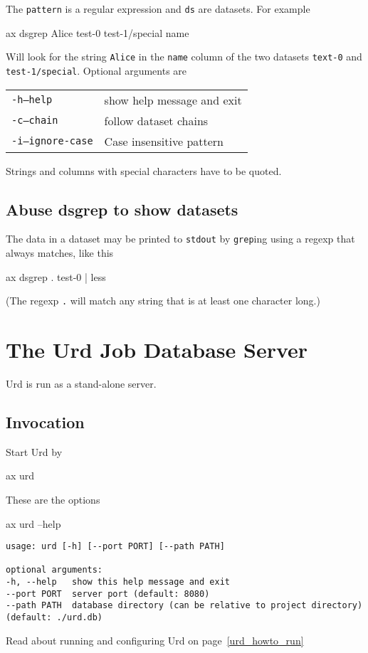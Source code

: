 The \texttt{pattern} is a regular expression and \texttt{ds} are
datasets.  For example
\begin{shell}
ax dsgrep Alice test-0 test-1/special name
\end{shell}
Will look for the string \texttt{Alice} in the \texttt{name} column of
the two datasets \texttt{text-0} and \texttt{test-1/special}.
Optional arguments are
\begin{snugshade}
  \begin{tabular}{p{4cm}p{9cm}}
      \texttt{-h}\hspace{3cm}\texttt{--help} & show help message and exit\\[4ex]
      \texttt{-c}\hspace{3cm}\texttt{--chain} & follow dataset chains\\[4ex]
      \texttt{-i}\hspace{3cm}\texttt{--ignore-case} & Case insensitive pattern\\[4ex]
  \end{tabular}
\end{snugshade}
Strings and columns with special characters have to be quoted.



\subsection{Abuse dsgrep to show datasets}
The data in a dataset may be printed to \texttt{stdout} by
\texttt{grep}ing using a regexp that always matches, like this
\begin{shell}
ax dsgrep . test-0 | less
\end{shell}
(The regexp \texttt{.} will match any string that is at least one character long.)




\section{The Urd Job Database Server}
Urd is run as a stand-alone server.
\subsection{Invocation}
Start Urd by
\begin{shell}
ax urd
\end{shell}
These are the options
\begin{shell}
ax urd --help
\end{shell}
\begin{snugshade}
\begin{verbatim}
usage: urd [-h] [--port PORT] [--path PATH]

optional arguments:
-h, --help   show this help message and exit
--port PORT  server port (default: 8080)
--path PATH  database directory (can be relative to project directory)
(default: ./urd.db)
\end{verbatim}
\end{snugshade}
Read about running and configuring Urd on page~\ref{urd_howto_run}



